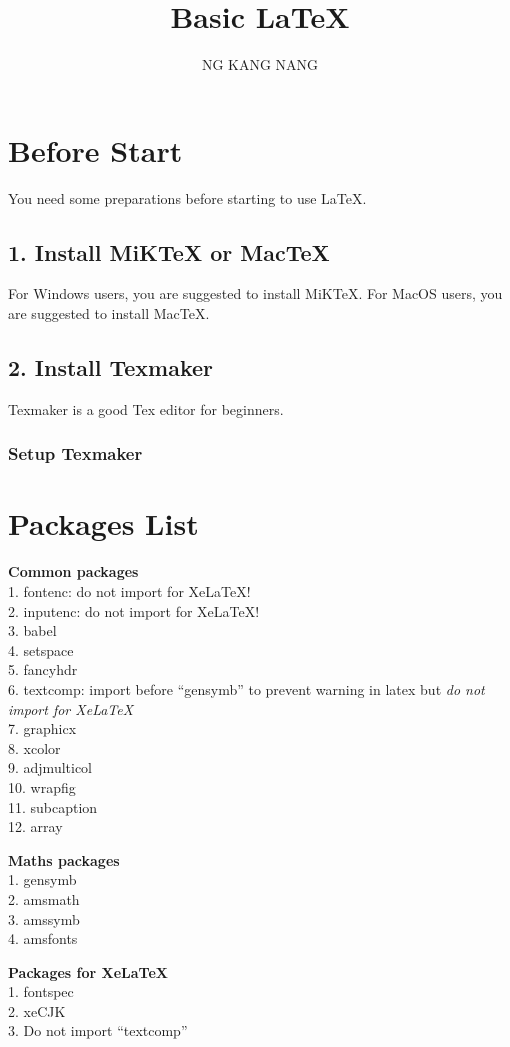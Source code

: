 \documentclass[10pt,a4paper,fleqn]{article}
\begin{document}
\title{\Huge \textbf{Basic \LaTeX}}
\author{NG KANG NANG}
\date{}
\maketitle 
\vfill %
\tableofcontents
\vfill
\pagebreak

\section*{Before Start}
You need some preparations before starting to use \LaTeX.
\subsection*{1. Install MiKTeX or MacTeX}
For Windows users, you are suggested to install MiKTeX. For MacOS users, you are suggested to install MacTeX.
\subsection*{2. Install Texmaker}
Texmaker is a good Tex editor for beginners.
\subsubsection*{ Setup Texmaker}
\clearpage
\section*{Packages List}
\begin{multicols}{3}
{\large \textbf{Common packages} }\\[1mm]
1. fontenc: do not import for XeLaTeX!\\
2. inputenc: do not import for XeLaTeX!\\
3. babel\\
4. setspace\\
5. fancyhdr\\
6. textcomp: import before ``gensymb'' to prevent warning in latex but \textit{do not import for XeLaTeX} \\
7. graphicx\\
8. xcolor\\
9. adjmulticol\\
10. wrapfig\\
11. subcaption\\
12. array
\columnbreak

{\large \textbf{Maths packages} }\\[1mm]
1. gensymb\\
2. amsmath\\
3. amssymb\\
4. amsfonts
\columnbreak

{\large \textbf{Packages for XeLaTeX} }\\[1mm]
1. fontspec\\
2. xeCJK\\
3. Do not import ``textcomp''
\end{multicols}
\end{document}
